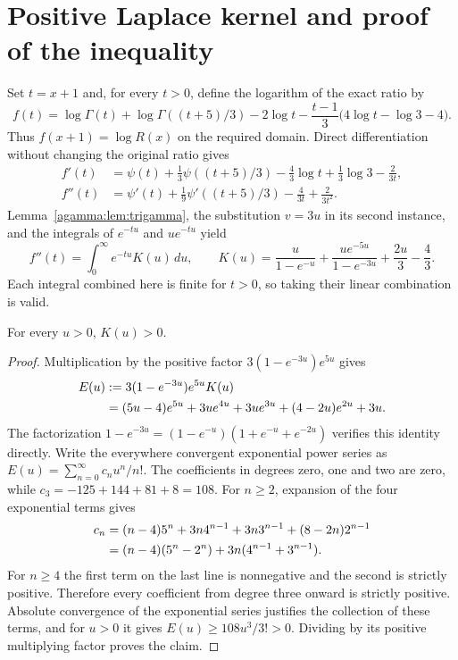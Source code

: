 \section{Positive Laplace kernel and proof of the inequality}
\label{agamma:sec:kernel}
Set $t=x+1$ and, for every $t>0$, define the logarithm of the exact
ratio by
\begin{equation}\label{agamma:eq:f}
f(t)=\log\Gamma(t)+\log\Gamma((t+5)/3)-2\log t
-\frac{t-1}{3}\bigl(4\log t-\log3-4\bigr).
\end{equation}
Thus $f(x+1)=\log R(x)$ on the required domain. Direct differentiation
without changing the original ratio gives
\begin{align}
f'(t)&=\psi(t)+\tfrac13\psi((t+5)/3)
-\tfrac43\log t+\tfrac13\log3-\tfrac2{3t},\label{agamma:eq:fp}\\
f''(t)&=\psi'(t)+\tfrac19\psi'((t+5)/3)
-\tfrac4{3t}+\tfrac2{3t^2}.\label{agamma:eq:fpp}
\end{align}
Lemma~\ref{agamma:lem:trigamma}, the substitution $v=3u$ in its second
instance, and the integrals of $e^{-tu}$ and $u e^{-tu}$ yield
\begin{equation}\label{agamma:eq:kernel}
f''(t)=\int_0^\infty e^{-tu}K(u)\,du,\qquad
K(u)=\frac{u}{1-e^{-u}}+
\frac{u e^{-5u}}{1-e^{-3u}}+\frac{2u}{3}-\frac43.
\end{equation}
Each integral combined here is finite for $t>0$, so taking their
linear combination is valid.

\begin{agammalemma}\label{agamma:lem:kernel-positive}
For every $u>0$, $K(u)>0$.
\end{agammalemma}
\begin{proof}
Multiplication by the positive factor $3(1-e^{-3u})e^{5u}$ gives
\begin{align}
E(u)&:=3(1-e^{-3u})e^{5u}K(u)\notag\\
&=(5u-4)e^{5u}+3u e^{4u}+3u e^{3u}
+(4-2u)e^{2u}+3u.\label{agamma:eq:E}
\end{align}
The factorization $1-e^{-3u}=(1-e^{-u})(1+e^{-u}+e^{-2u})$
verifies this identity directly. Write the everywhere convergent
exponential power series as $E(u)=\sum_{n=0}^\infty c_nu^n/n!$.
The coefficients in degrees zero, one and two are zero, while
$c_3=-125+144+81+8=108$. For $n\ge2$, expansion of the four
exponential terms gives
\begin{align}
c_n&=(n-4)5^n+3n4^{n-1}+3n3^{n-1}
+(8-2n)2^{n-1}\notag\\
&=(n-4)(5^n-2^n)+3n(4^{n-1}+3^{n-1}).\label{agamma:eq:coefficients}
\end{align}
For $n\ge4$ the first term on the last line is nonnegative and
the second is strictly positive. Therefore every coefficient from
degree three onward is strictly positive. Absolute convergence of
the exponential series justifies the collection of these terms,
and for $u>0$ it gives $E(u)\ge108u^3/3!>0$.
Dividing by its positive multiplying factor proves the claim.
\end{proof}

